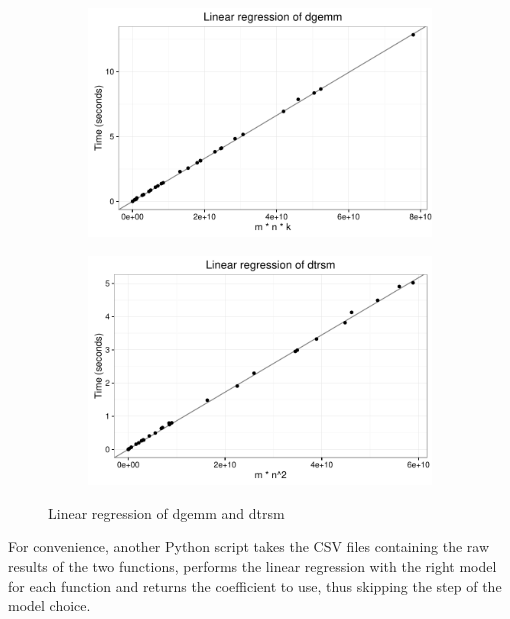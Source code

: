 \documentclass[12pt, a4paper]{memoir}
\begin{document}
\begin{figure}[htpb]
\centering
\begin{subfigure}{.5\textwidth}
  \centering
  \includegraphics[width=\linewidth]{../blas_reg/dgemm.pdf}
\end{subfigure}%
\begin{subfigure}{.5\textwidth}
  \centering
  \includegraphics[width=\linewidth]{../blas_reg/dtrsm.pdf}
\end{subfigure}
\caption{Linear regression of dgemm and dtrsm}
\label{fig:blas_regression}
\end{figure}

For convenience, another Python script takes the CSV files containing the raw results of the two functions, performs
the linear regression with the right model for each function and returns the coefficient to use, thus skipping the
step of the model choice.
\end{document}
